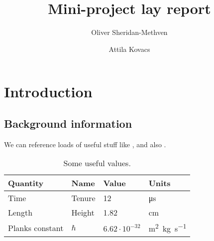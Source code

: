 \documentclass[english,twoside,10pt]{extarticle}
\title{Mini-project lay report}
\author{Oliver Sheridan-Methven \and Attila Kovacs}
\begin{document}





\cleardoublepage %
\setcounter{section}{0}

\section{Introduction}
\subsection{Background information}
\lipsum[2]

We can reference loads of useful stuff like , and also .
\begin{table}[htb]
\centering
\begin{tabular}{llll}
Quantity & Name & Value & Units \\ \hline
Time & Tenure & 12 & \si{\micro\second} \\
Length & Height & 1.82 & \si{\centi\meter} \\
Planks constant & $ \hbar $ & $ 6.62\cdot10^{-32} $ & \si{\meter^2.\kilogram.\second^{-1}} \\
\end{tabular}
\caption{Some useful values.}
\label{tab:some_useful_values}
\end{table}
\end{document}
